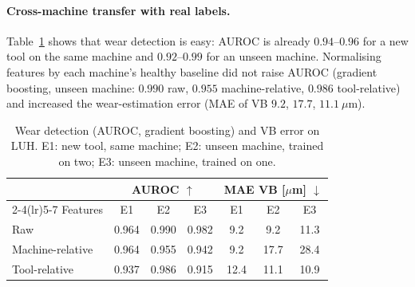 \documentclass[11pt]{article}
\newcommand{\best}[1]{\cellcolor{gray!18}#1}
\begin{document}
\paragraph{Cross-machine transfer with real labels.} Table~\ref{tab:luh} shows that wear detection is easy: AUROC is already $0.94$--$0.96$ for a new tool on the same machine and $0.92$--$0.99$ for an unseen machine. Normalising features by each machine's healthy baseline did not raise AUROC (gradient boosting, unseen machine: $0.990$ raw, $0.955$ machine-relative, $0.986$ tool-relative) and increased the wear-estimation error (MAE of VB $9.2$, $17.7$, $11.1~\mu$m).
\begin{table}[t]\centering\small
\caption{Wear detection (AUROC, gradient boosting) and VB error on LUH. E1: new tool, same machine; E2: unseen machine, trained on two; E3: unseen machine, trained on one.}\label{tab:luh}
\begin{tabular}{lcccccc}\toprule
 & \multicolumn{3}{c}{AUROC $\uparrow$} & \multicolumn{3}{c}{MAE VB [$\mu$m] $\downarrow$}\\\cmidrule(lr){2-4}\cmidrule(lr){5-7}
Features & E1 & E2 & E3 & E1 & E2 & E3\\\midrule
Raw & 0.964 & \best{0.990} & \best{0.982} & 9.2 & 9.2 & 11.3\\
Machine-relative & 0.964 & 0.955 & 0.942 & 9.2 & 17.7 & 28.4\\
Tool-relative & 0.937 & 0.986 & 0.915 & 12.4 & 11.1 & 10.9\\\bottomrule
\end{tabular}
\end{table}
\end{document}
